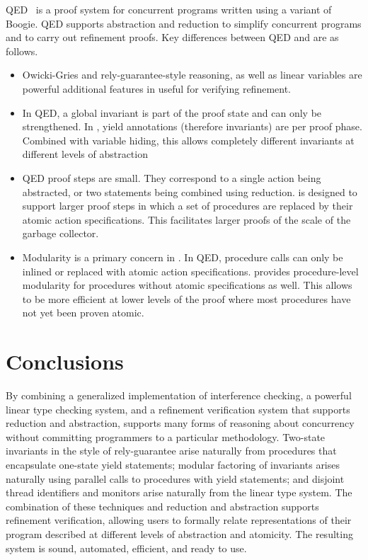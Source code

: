 QED~\cite{ElmasQT09} is a proof system for concurrent programs written using a variant of Boogie. QED supports abstraction and reduction to simplify concurrent programs and to carry out refinement proofs. Key differences between QED and \civl are as follows.
\begin{itemize}
\item Owicki-Gries and rely-guarantee-style reasoning, as well as linear variables are powerful additional features in \civl useful for verifying refinement. 
\item In QED, a global invariant is part of the proof state and can only be strengthened. In \civl, yield annotations (therefore invariants) are per proof phase. Combined with variable hiding, this allows completely different invariants at different levels of abstraction
\item QED proof steps are small. They correspond to a single action being abstracted, or two statements being combined using reduction. \civl is designed to support larger proof steps in which a set of procedures are replaced by their atomic action specifications. This facilitates larger proofs of the scale of the garbage collector.  
\item Modularity is a primary concern in \civl. In QED, procedure calls can only be inlined or replaced with atomic action specifications. \civl provides procedure-level modularity for procedures without atomic specifications as well. This allows \civl to be more efficient at lower levels of the proof where most procedures have not yet been proven atomic. 
\end{itemize}

\section{Conclusions}

By combining a generalized implementation of interference checking, a powerful linear type checking system, and a refinement verification system that supports reduction and abstraction, 
\civl supports many forms of reasoning about concurrency without committing programmers to a particular methodology.
Two-state invariants in the style of rely-guarantee arise naturally from procedures that encapsulate one-state yield statements;
modular factoring of invariants arises naturally using parallel calls to procedures with yield statements;
and disjoint thread identifiers and monitors arise naturally from the linear type system. The combination of these techniques and reduction and abstraction supports refinement verification, allowing users to formally relate representations of their program described at different levels of abstraction and atomicity. 
The resulting system is sound, automated, efficient, and ready to use.

